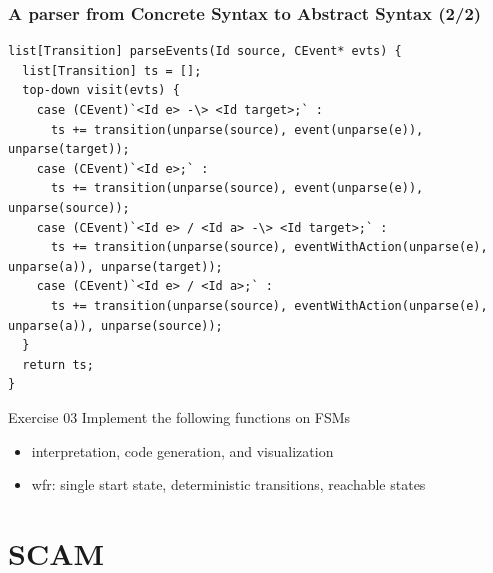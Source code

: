 \documentclass{beamer}
\begin{document}
\begin{frame}[fragile]
\frametitle{A parser from Concrete Syntax to Abstract Syntax (2/2)}

\begin{lstlisting}[language=Rascal]
list[Transition] parseEvents(Id source, CEvent* evts) {
  list[Transition] ts = [];
  top-down visit(evts) {
    case (CEvent)`<Id e> -\> <Id target>;` : 
      ts += transition(unparse(source), event(unparse(e)), unparse(target));
    case (CEvent)`<Id e>;` : 
      ts += transition(unparse(source), event(unparse(e)), unparse(source));
    case (CEvent)`<Id e> / <Id a> -\> <Id target>;` : 
      ts += transition(unparse(source), eventWithAction(unparse(e), unparse(a)), unparse(target));
    case (CEvent)`<Id e> / <Id a>;` : 
      ts += transition(unparse(source), eventWithAction(unparse(e), unparse(a)), unparse(source));
  }
  return ts;
}
\end{lstlisting}

\end{frame}

\begin{frame}

  \begin{block}{Exercise 03}
    Implement the following functions on FSMs
    \begin{itemize}
      \item interpretation, code generation, and visualization
      \item wfr: single start state, deterministic transitions, reachable states
    \end{itemize}
  \end{block}
\end{frame}

\section{SCAM}

\end{document}
